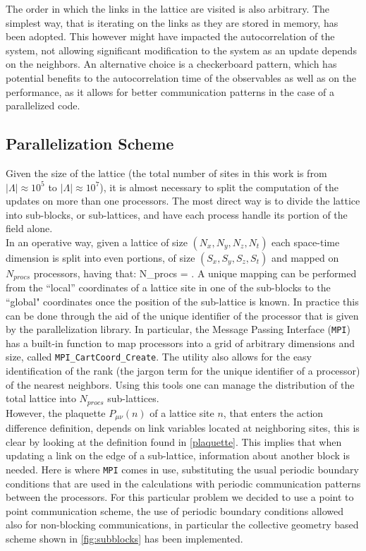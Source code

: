 The order in which the links in the lattice are visited is also arbitrary. The simplest way, that is iterating on the links as they are stored in memory, has been adopted. This however might have impacted the autocorrelation of the system, not allowing significant modification to the system as an update depends on the neighbors. An alternative choice is a checkerboard pattern, which has potential benefits to the autocorrelation time of the observables as well as on the performance, as it allows for better communication patterns in the case of a parallelized code. 

\subsection{Parallelization Scheme}
\label{sec:para_gen}
Given the size of the lattice (the total number of sites in this work is from $|\Lambda| \approx 10^5$ to $|\Lambda|\approx 10^7$), it is almost necessary to split the computation of the updates on more than one processors. The most direct way is to divide the lattice into sub-blocks, or sub-lattices, and have each process handle its portion of the field alone. \\
In an operative way, given a lattice of size $(N_x, N_y, N_z, N_t)$ each space-time dimension is split into even portions, of size $(S_x, S_y, S_z, S_t)$ and mapped on $N_{procs}$ processors, having that:
\beq
N_{procs} =  \times {} \times {}  \times {}.
\eeq 
A unique mapping can be performed from the ``local'' coordinates of a lattice site in one of the sub-blocks to the ``global" coordinates once the position of the sub-lattice is known. In practice this can be done through the aid of the unique identifier of the processor that is given by the parallelization library. In particular, the Message Passing Interface (\texttt{MPI}) has a built-in function to map processors into a grid of arbitrary dimensions and size, called \texttt{MPI\_CartCoord\_Create}. The utility also allows for the easy identification of the rank (the jargon term for the unique identifier of a processor) of the nearest neighbors. Using this tools one can manage the distribution of the total lattice into $N_{procs}$ sub-lattices. \\
However, the plaquette $P_{\mu\nu}(n)$ of a lattice site $n$, that enters the action difference definition, depends on link variables located at neighboring sites, this is clear by looking at the definition found in \cref{plaquette}. This implies that when updating a link on the edge of a sub-lattice, information about another block is needed. Here is where \texttt{MPI} comes in use, substituting the usual periodic boundary conditions that are used in the calculations with periodic communication patterns between the processors. For this particular problem we decided to use a point to point communication scheme, the use of periodic boundary conditions allowed also for non-blocking communications, in particular the collective geometry based scheme shown in \cref{fig:subblocks} has been implemented. 

